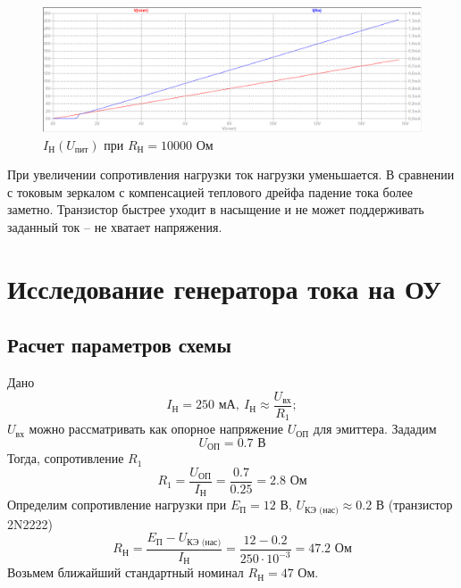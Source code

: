 \documentclass[a4paper, 12pt]{article}
\begin{document}
    \begin{figure}[H]
        \centering
        \includegraphics[scale=0.46]{2task_Iн(Vпит)_Rн10000.png}
        \captionsetup{skip=0pt}
        \caption{$I_\text{Н}\left( U_\text{пит} \right)$ при $R_\text{Н}=10000$ Ом}
        \label{fig:2task_InVlR10000}
    \end{figure}
    \noindent При увеличении сопротивления нагрузки ток нагрузки уменьшается.
    В сравнении с токовым зеркалом с компенсацией теплового дрейфа падение тока более заметно.
    Транзистор быстрее уходит в насыщение и не может поддерживать заданный ток -- не хватает напряжения.


    \section{Исследование генератора тока на ОУ}
    \subsection{Расчет параметров схемы}
    Дано
    $$
    I_\text{Н}=250\text{ мА},\ I_\text{Н}\approx\dfrac{U_\text{вх}}{R_1};
    $$
    $U_\text{вх}$ можно рассматривать как опорное напряжение $U_\text{ОП}$ для эмиттера. Зададим
    $$
    U_\text{ОП}=0.7\text{ В}
    $$
    Тогда, сопротивление $R_1$
    $$
    R_1=\dfrac{U_\text{ОП}}{I_\text{Н}}=\dfrac{0.7}{0.25}=2.8\text{ Ом}
    $$
    Определим сопротивление нагрузки при $E_\text{П}=12$ В, $U_\text{КЭ (нас)}\approx0.2$ В (транзистор 2N2222)
    $$
    R_\text{Н}=\dfrac{E_\text{П}-U_\text{КЭ (нас)}}{I_\text{Н}}=\dfrac{12-0.2}{250\cdot10^{-3}}=47.2\text{ Ом}
    $$
    Возьмем ближайший стандартный номинал $R_\text{Н}=47$ Ом.
\end{document}
